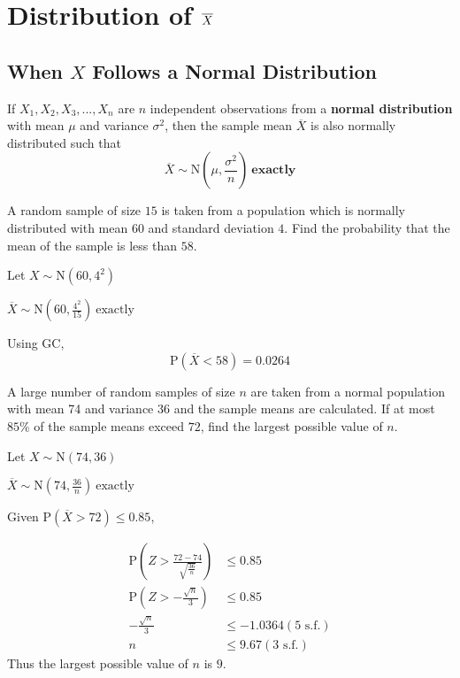 \documentclass[11pt,a4paper]{book}
\begin{document}
\section{Distribution of $\textbf{\ensuremath{\overline{X}}}$ }

\subsection{When $X$ Follows a Normal Distribution}

\begin{tcolorbox}[colback=blue!5, colframe=black, boxrule=.4pt, sharpish corners]

If $X_{1},X_{2},X_{3},...,X_{n}$ are $n$ independent observations
from a \textbf{normal distribution} with mean $\mu$ and variance
$\sigma^{2}$, then the sample mean $\overline{X}$ is also normally
distributed such that 
\[
\overline{X}\sim\text{N}\left(\mu,\frac{\sigma^{2}}{n}\right)\:\textbf{exactly}
\]

\end{tcolorbox}

\begin{example}

A random sample of size $15$ is taken from a population which is
normally distributed with mean $60$ and standard deviation $4$.
Find the probability that the mean of the sample is less than $58$.

\Solution

Let ${\displaystyle X\sim\text{N}\left(60,4^{2}\right)}$

${\displaystyle \overline{X}\sim\text{N}\left(60,\frac{4^{2}}{15}\right)}\:\text{exactly}$

Using GC, 
\[
\text{P}\left(\overline{X}<58\right)=0.0264
\]
\end{example}

\newpage

\begin{example}

A large number of random samples of size $n$ are taken from a normal
population with mean 74 and variance 36 and the sample means are calculated.
If at most $85\%$ of the sample means exceed $72$, find the largest
possible value of $n$.

\Solution

Let ${\displaystyle X\sim\text{N}\left(74,36\right)}$

${\displaystyle \overline{X}\sim\text{N}\left(74,\frac{36}{n}\right)}\:\text{exactly}$

Given $\text{P}\left(\overline{X}>72\right)\leq0.85$,

\begin{align*}
\text{P}\left(Z>\frac{72-74}{\sqrt{\frac{36}{n}}}\right) & \leq0.85\\
\text{P}\left(Z>-\frac{\sqrt{n}}{3}\right) & \leq0.85\\
-\frac{\sqrt{n}}{3} & \leq-1.0364(\text{5 s.f.})\\
n & \leq9.67(\text{3 s.f.})
\end{align*}
Thus the largest possible value of $n$ is $9$.

\end{example}
\end{document}
